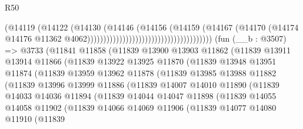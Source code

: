 \begin{lexlean}{R50}
\begin{coremodule}
                                                                (@14119
                                                                  (@14122
                                                                    (@14130
                                                                      (@14146
                                                                        (@14156
                                                                          (@14159
                                                                            (@14167
                                                                              (@14170
                                                                                (@14174
                                                                                  @14176
                                                                                  @11362
                                                                                  @4062)))))))))))))))))))))))))))))))))))))))
    (fun (__b : @3507) =>
    @3733
      (@11841
        @11858
        (@11839
          @13900
          @13903
          @11862
          (@11839
            @13911
            @13914
            @11866
            (@11839
              @13922
              @13925
              @11870
              (@11839
                @13948
                @13951
                @11874
                (@11839
                  @13959
                  @13962
                  @11878
                  (@11839
                    @13985
                    @13988
                    @11882
                    (@11839
                      @13996
                      @13999
                      @11886
                      (@11839
                        @14007
                        @14010
                        @11890
                        (@11839
                          @14033
                          @14036
                          @11894
                          (@11839
                            @14044
                            @14047
                            @11898
                            (@11839
                              @14055
                              @14058
                              @11902
                              (@11839
                                @14066
                                @14069
                                @11906
                                (@11839
                                  @14077
                                  @14080
                                  @11910
                                  (@11839

\end{coremodule}
\end{lexlean}
